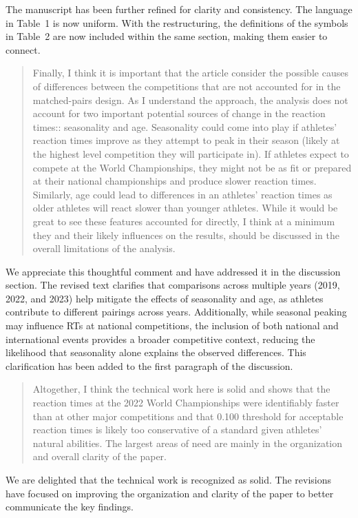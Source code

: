 \documentclass[12pt]{article}
\newenvironment{comment}%
{\begin{quotation}\noindent\small\it\color{darkblue}\ignorespaces%
}{\end{quotation}}
\begin{document}
The manuscript has been further refined for clarity and
consistency. The language in Table~1 is now uniform. With the
restructuring, the definitions of the symbols in Table~2 are now
included within the same section, making them easier to connect.

\begin{comment}
Finally, I think it is important that the article consider the possible causes
of differences between the competitions that are not accounted for in the
matched-pairs design. As I understand the approach, the analysis does not
account for two important potential sources of change in the reaction times::
seasonality and age. Seasonality could come into play if athletes' reaction
times improve as they attempt to peak in their season (likely at the highest
level competition they will participate in). If athletes expect to compete at
the World Championships, they might not be as fit or prepared at their national
championships and produce slower reaction times. Similarly, age could lead to
differences in an athletes' reaction times as older athletes will react slower
than younger athletes. While it would be great to see these features accounted
for directly, I think at a minimum they and their likely influences on the
results, should be discussed in the overall limitations of the analysis.
\end{comment}

We appreciate this thoughtful comment and have addressed it in the
discussion section. The revised text clarifies that comparisons across
multiple years (2019, 2022, and 2023) help mitigate the effects of
seasonality and age, as athletes contribute to different pairings
across years. Additionally, while seasonal peaking may influence RTs
at national competitions, the inclusion of both national and
international events provides a broader competitive context, reducing
the likelihood that seasonality alone explains the observed
differences. This clarification has been added to the first paragraph
of the discussion.

\begin{comment}
Altogether, I think the technical work here is solid and shows that the reaction
times at the 2022 World Championships were identifiably faster than at other
major competitions and that 0.100 threshold for acceptable reaction times is
likely too conservative of a standard given athletes' natural abilities. The
largest areas of need are mainly in the organization and overall clarity of the
paper.
\end{comment}

We are delighted that the technical work
is recognized as solid. The revisions have focused on improving the
organization and clarity of the paper to better communicate the key
findings.


% 
% 
\end{document}
